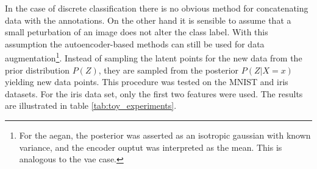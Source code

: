 In the case of discrete classification there is no obvious method for concatenating data with the annotations. On the other hand it is sensible to assume that a small peturbation of an image does not alter the class label. With this assumption the autoencoder-based methods can still be used for data augmentation\footnote{For the \acrshort{aegan}, the posterior was asserted as an isotropic gaussian with known variance, and the encoder ouptut was interpreted as the mean. This is analogous to the \acrshort{vae} case.}. Instead of sampling the latent points for the new data from the prior distribution $P(Z)$, they are sampled from the posterior $P(Z|X=x)$ yielding new data points. This procedure was tested on the MNIST and iris datasets. For the iris data set, only the first two features were used. The results are illustrated in table \ref{tab:toy_experiments}. %










